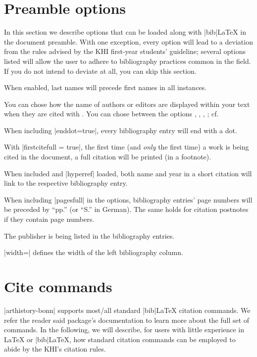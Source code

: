 \documentclass[a4paper,
10pt,
ngerman,
english
]{ltxdoc}
\begin{document}
\section{Preamble options}\label{preamble_options}
In this section we describe options that can be loaded along with |bib|\LaTeX{} in the document preamble. With one exception, every option will lead to a deviation from the rules advised by the KHI first-year students' guideline; several options listed will allow the user to adhere to bibliography practices common in the field. If you do not intend to deviate at all, you can skip this section.

When enabled, last names will precede first names in all instances.

You can chose how the name of authors or editors are displayed within your text when they are cited with .
You can chose between the options , , , ; 
cf. %

When including |enddot=true|, every bibliography entry will end with a dot.

With |firstcitefull = true|, the first time (and \emph{only} the first time) a work is being cited in the document, a full citation will be printed (in a footnote).

When included and |hyperref| loaded, both name and year in a short citation will link to the respective bibliography entry.

When including |pagesfull| in the options, bibliography entries' page numbers will be preceded by \enquote{pp.} (or \enquote{S.} in German). The same holds for citation postnotes if they contain page numbers.

The publisher is being listed in the bibliography entries.

|width=| defines the width of the left bibliography column.


\section{Cite commands}\label{cite-commands}
|arthistory-bonn| supports most/all standard |bib|\LaTeX{} citation commands. We refer the reader said package's documentation to learn more about the full set of commands. In the following, we will describe, for users with little experience in \LaTeX{} or |bib|\LaTeX, how standard citation commands can be employed to abide by the KHI's citation rules.
\end{document}
